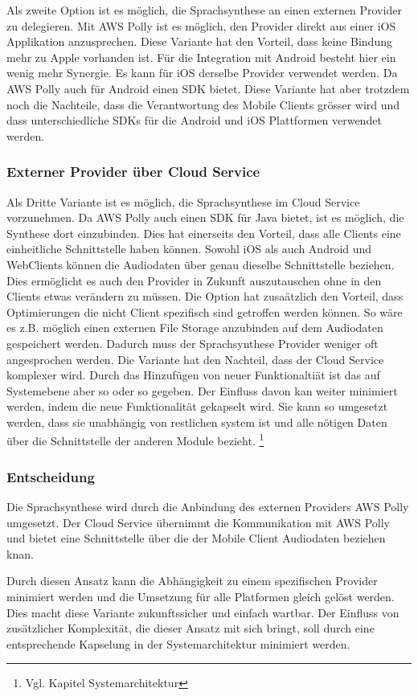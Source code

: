 Als zweite Option ist es möglich, die Sprachsynthese an einen externen Provider zu delegieren.
Mit AWS Polly\cite{aws_polly} ist es möglich, den Provider direkt aus einer iOS Applikation anzusprechen.
Diese Variante hat den Vorteil, dass keine Bindung mehr zu Apple vorhanden ist.
Für die Integration mit Android besteht hier ein wenig mehr Synergie.
Es kann für iOS derselbe Provider verwendet werden.
Da AWS Polly auch für Android einen SDK bietet.
Diese Variante hat aber trotzdem noch die Nachteile, dass die Verantwortung des Mobile Clients grösser wird
und dass unterschiedliche SDKs für die Android und iOS Plattformen verwendet werden.

\subsubsection*{Externer Provider über Cloud Service}

Als Dritte Variante ist es möglich, die Sprachsynthese im Cloud Service vorzunehmen.
Da AWS Polly auch einen SDK für Java bietet, ist es möglich, die Synthese dort einzubinden.
Dies hat einerseits den Vorteil, dass alle Clients eine einheitliche Schnittstelle haben können.
Sowohl iOS als auch Android und WebClients können die Audiodaten über genau dieselbe Schnittstelle beziehen.
Dies ermöglicht es auch den Provider in Zukunft auszutauschen ohne in den Clients etwas verändern zu müssen.
Die Option hat zusaätzlich den Vorteil, dass Optimierungen die nicht Client spezifisch sind getroffen werden können.
So wäre es z.B. möglich einen externen File Storage anzubinden auf dem Audiodaten gespeichert werden.
Dadurch muss der Sprachsynthese Provider weniger oft angesprochen werden.
Die Variante hat den Nachteil, dass der Cloud Service komplexer wird.
Durch das Hinzufügen von neuer Funktionaltiät ist das auf Systemebene aber so oder so gegeben.
Der Einfluss davon kan weiter minimiert werden, indem die neue Funktionalität gekapselt wird.
Sie kann so umgesetzt werden, dass sie unabhängig von restlichen system ist und alle nötigen Daten über die
Schnittstelle der anderen Module bezieht. \footnote{Vgl. Kapitel Systemarchitektur}

\subsubsection*{Entscheidung}

Die Sprachsynthese wird durch die Anbindung des externen Providers AWS Polly umgesetzt.
Der Cloud Service übernimmt die Kommunikation mit AWS Polly und bietet eine Schnittstelle über die der Mobile Client Audiodaten beziehen knan.

Durch diesen Ansatz kann die Abhängigkeit zu einem spezifischen Provider minimiert werden und
die Umsetzung für alle Platformen gleich gelöst werden.
Dies macht diese Variante zukunftssicher und einfach wartbar.
Der Einfluss von zusätzlicher Komplexität, die dieser Ansatz mit sich bringt,
soll durch eine entsprechende Kapselung in der Systemarchitektur minimiert werden.

\clearpage
